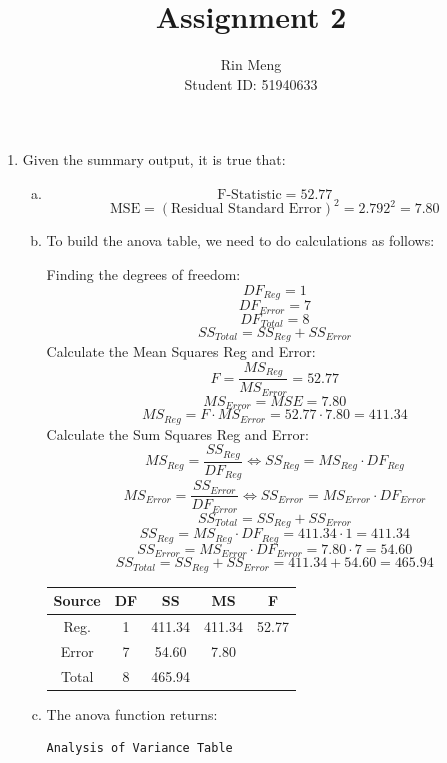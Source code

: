 \documentclass[12pt]{article}
\title{Assignment 2}
\author{Rin Meng \\ Student ID: 51940633}
\begin{document}
\maketitle

\begin{enumerate}[1.]
    \item Given the summary output, it is true that:
    \begin{enumerate}[(a)]
        \item \[\text{F-Statistic} = 52.77\]
        \[\text{MSE} = (\text{Residual Standard Error})^2 = 2.792^2 =  7.80\]
        \item To build the anova table, we need to do calculations as follows:
        
            Finding the degrees of freedom:
            \[ DF_{Reg} = 1 \]
            \[ DF_{Error} = 7 \]
            \[ DF_{Total} = 8 \]
            \[ SS_{Total} = SS_{Reg} + SS_{Error}\]
            Calculate the Mean Squares Reg and Error:
            \[ F = \frac{MS_{Reg}}{MS_{Error}} = 52.77\]
            \[ MS_{Error} = MSE = 7.80\]
            \[ MS_{Reg} = F \cdot MS_{Error} = 52.77 \cdot 7.80 = 411.34\]
            Calculate the Sum Squares Reg and Error:
            \[ MS_{Reg} = \frac{SS_{Reg}}{DF_{Reg}} \Leftrightarrow SS_{Reg} = MS_{Reg} \cdot DF_{Reg}\]
            \[ MS_{Error} = \frac{SS_{Error}}{DF_{Error}} \Leftrightarrow SS_{Error} = MS_{Error} \cdot DF_{Error}\]
            \[ SS_{Total} = SS_{Reg} + SS_{Error}\]
            \[ SS_{Reg} = MS_{Reg} \cdot DF_{Reg} = 411.34 \cdot 1 = 411.34\]
            \[ SS_{Error} = MS_{Error} \cdot DF_{Error}= 7.80 \cdot 7 = 54.60 \]
            \[ SS_{Total} = SS_{Reg} + SS_{Error} = 411.34 + 54.60 = 465.94\]
            \begin{center}
                \begin{tabular}{|c|c|c|c|c|}
                    \hline
                    Source & DF & SS & MS & F \\
                    \hline
                    Reg. & 1 & 411.34 & 411.34 & 52.77 \\
                    Error & 7 & 54.60 & 7.80 &  \\
                    Total & 8 & 465.94 &  & \\
                    \hline
                \end{tabular}
            \end{center}
        \item The anova function returns:
            \begin{verbatim}
Analysis of Variance Table


\end{verbatim}
\end{enumerate}
\end{enumerate}
\end{document}
